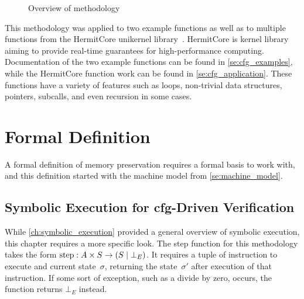 \begin{figure}
  \centering
  \caption{Overview of methodology}\label{fig:cfg_overview}
\end{figure}

This methodology was applied to two example functions
as well as to multiple functions
from the HermitCore unikernel library~\citep{lankes2016hermitcore}.%
%
HermitCore is  kernel library aiming to provide real-time guarantees for high-performance computing.
Documentation of the two example functions can be found in \cref{se:cfg_examples},
while the HermitCore function work can be found in \cref{se:cfg_application}.
These functions have a variety of features such as loops,%
non-trivial data structures, pointers, subcalls, and even recursion in some cases.%
%

\section{Formal Definition}
A formal definition of memory preservation requires a formal basis to work with,
and this definition started with the machine model from \cref{se:machine_model}.

\subsection{Symbolic Execution for \acs*{cfg}-Driven Verification}\label{cfg_symb_exec}
While \cref{ch:symbolic_execution} provided a general overview of symbolic execution,
this chapter requires a more specific look.
The step function for this methodology takes the form
$\operatorname{step}:A\times S\rightarrow(S\mid\bot_E)$.%
%
%
It requires a tuple of instruction to execute and current state~$\sigma$,
returning the state~$\sigma'$ after execution of that instruction.
If some sort of exception, such as a divide by zero, occurs,
the function returns $\bot_E$ instead.


